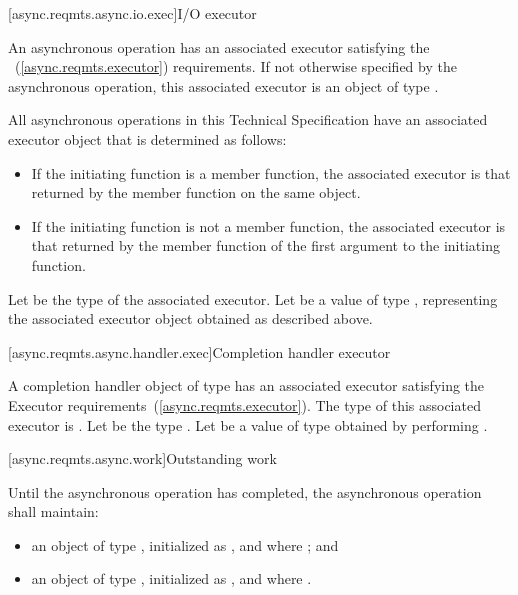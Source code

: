 [async.reqmts.async.io.exec]{I/O executor}

%
\pnum
An asynchronous operation has an associated executor satisfying the ~(\ref{async.reqmts.executor}) requirements. If not otherwise specified by the asynchronous operation, this associated executor is an object of type .

\pnum
 All asynchronous operations in this Technical Specification have an associated executor object that is determined as follows:

\begin{itemize}
\item
If the initiating function is a member function, the associated executor is that returned by the  member function on the same object.

\item
If the initiating function is not a member function, the associated executor is that returned by the  member function of the first argument to the initiating function.
\end{itemize}

\pnum
Let  be the type of the associated executor. Let  be a value of type , representing the associated executor object obtained as described above.



[async.reqmts.async.handler.exec]{Completion handler executor}

\pnum
A completion handler object of type 
has an associated executor
satisfying the Executor requirements~(\ref{async.reqmts.executor}).
The type of this associated executor is
.
Let  be the type
.
Let  be a value of type 
obtained by performing .



[async.reqmts.async.work]{Outstanding work}

%
\pnum
Until the asynchronous operation has completed, the asynchronous operation shall maintain:

\begin{itemize}
\item
an object  of type , initialized as , and where ; and

\item
an object  of type , initialized as , and where .
\end{itemize}



